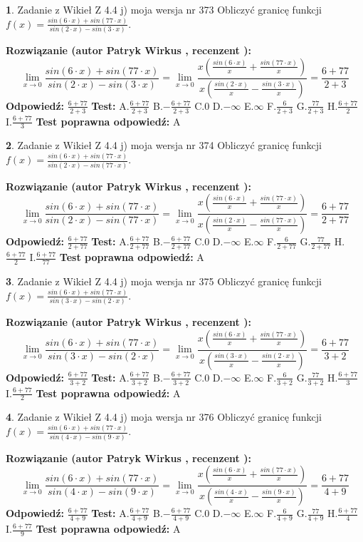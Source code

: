 \documentclass[12pt, a4paper]{article}
\theoremstyle{definition} %
\newtheorem{zad}{}
\newcommand{\zadStart}[1]{\begin{zad}#1\newline}
\newcommand{\zadStop}{\end{zad}}
\newcommand{\rozwStart}[2]{\noindent \textbf{Rozwiązanie (autor #1 , recenzent #2): }\newline}
\newcommand{\rozwStop}{\newline}
\newcommand{\odpStart}{\noindent \textbf{Odpowiedź:}\newline}
\newcommand{\odpStop}{\newline}
\newcommand{\testStart}{\noindent \textbf{Test:}\newline}
\newcommand{\testStop}{\newline}
\newcommand{\kluczStart}{\noindent \textbf{Test poprawna odpowiedź:}\newline}
\newcommand{\kluczStop}{\newline}
\begin{document}
\zadStart{Zadanie z Wikieł Z 4.4 j) moja wersja nr 373}
Obliczyć granicę funkcji $f(x)=\frac{sin(6\cdot x) +sin(77\cdot x)}{sin(2\cdot x) -sin(3\cdot x)}$.
\zadStop
\rozwStart{Patryk Wirkus}{}
$$\lim\limits_{x\to 0}\frac{sin(6\cdot x) +sin(77\cdot x)}{sin(2\cdot x) -sin(3\cdot x)}=\lim\limits_{x\to 0}\frac{x(\frac{sin(6\cdot x)}{x}+\frac{sin(77\cdot x)}{x})}{x(\frac{sin(2\cdot x)}{x}-\frac{sin(3\cdot x)}{x})}=\frac{6+77}{2+3}$$
\rozwStop
\odpStart
$\frac{6+77}{2+3}$
\odpStop
\testStart
A.$\frac{6+77}{2+3}$
B.$-\frac{6+77}{2+3}$
C.$0$
D.$-\infty$
E.$\infty$
F.$\frac{6}{2+3}$
G.$\frac{77}{2+3}$
H.$\frac{6+77}{2}$
I.$\frac{6+77}{3}$
\testStop
\kluczStart
A
\kluczStop



\zadStart{Zadanie z Wikieł Z 4.4 j) moja wersja nr 374}
Obliczyć granicę funkcji $f(x)=\frac{sin(6\cdot x) +sin(77\cdot x)}{sin(2\cdot x) -sin(77\cdot x)}$.
\zadStop
\rozwStart{Patryk Wirkus}{}
$$\lim\limits_{x\to 0}\frac{sin(6\cdot x) +sin(77\cdot x)}{sin(2\cdot x) -sin(77\cdot x)}=\lim\limits_{x\to 0}\frac{x(\frac{sin(6\cdot x)}{x}+\frac{sin(77\cdot x)}{x})}{x(\frac{sin(2\cdot x)}{x}-\frac{sin(77\cdot x)}{x})}=\frac{6+77}{2+77}$$
\rozwStop
\odpStart
$\frac{6+77}{2+77}$
\odpStop
\testStart
A.$\frac{6+77}{2+77}$
B.$-\frac{6+77}{2+77}$
C.$0$
D.$-\infty$
E.$\infty$
F.$\frac{6}{2+77}$
G.$\frac{77}{2+77}$
H.$\frac{6+77}{2}$
I.$\frac{6+77}{77}$
\testStop
\kluczStart
A
\kluczStop



\zadStart{Zadanie z Wikieł Z 4.4 j) moja wersja nr 375}
Obliczyć granicę funkcji $f(x)=\frac{sin(6\cdot x) +sin(77\cdot x)}{sin(3\cdot x) -sin(2\cdot x)}$.
\zadStop
\rozwStart{Patryk Wirkus}{}
$$\lim\limits_{x\to 0}\frac{sin(6\cdot x) +sin(77\cdot x)}{sin(3\cdot x) -sin(2\cdot x)}=\lim\limits_{x\to 0}\frac{x(\frac{sin(6\cdot x)}{x}+\frac{sin(77\cdot x)}{x})}{x(\frac{sin(3\cdot x)}{x}-\frac{sin(2\cdot x)}{x})}=\frac{6+77}{3+2}$$
\rozwStop
\odpStart
$\frac{6+77}{3+2}$
\odpStop
\testStart
A.$\frac{6+77}{3+2}$
B.$-\frac{6+77}{3+2}$
C.$0$
D.$-\infty$
E.$\infty$
F.$\frac{6}{3+2}$
G.$\frac{77}{3+2}$
H.$\frac{6+77}{3}$
I.$\frac{6+77}{2}$
\testStop
\kluczStart
A
\kluczStop



\zadStart{Zadanie z Wikieł Z 4.4 j) moja wersja nr 376}
Obliczyć granicę funkcji $f(x)=\frac{sin(6\cdot x) +sin(77\cdot x)}{sin(4\cdot x) -sin(9\cdot x)}$.
\zadStop
\rozwStart{Patryk Wirkus}{}
$$\lim\limits_{x\to 0}\frac{sin(6\cdot x) +sin(77\cdot x)}{sin(4\cdot x) -sin(9\cdot x)}=\lim\limits_{x\to 0}\frac{x(\frac{sin(6\cdot x)}{x}+\frac{sin(77\cdot x)}{x})}{x(\frac{sin(4\cdot x)}{x}-\frac{sin(9\cdot x)}{x})}=\frac{6+77}{4+9}$$
\rozwStop
\odpStart
$\frac{6+77}{4+9}$
\odpStop
\testStart
A.$\frac{6+77}{4+9}$
B.$-\frac{6+77}{4+9}$
C.$0$
D.$-\infty$
E.$\infty$
F.$\frac{6}{4+9}$
G.$\frac{77}{4+9}$
H.$\frac{6+77}{4}$
I.$\frac{6+77}{9}$
\testStop
\kluczStart
A
\kluczStop
\end{document}
